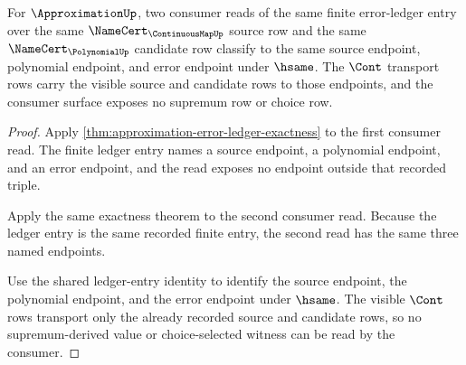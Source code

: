 \begin{theorem}
\label{thm:approximation-finite-error-ledger-consumer-determinacy}
For $\ApproximationUp$, two consumer reads of the same finite error-ledger
entry over the same $\NameCert_{\ContinuousMapUp}$ source row and the same
$\NameCert_{\PolynomialUp}$ candidate row classify to the same source
endpoint, polynomial endpoint, and error endpoint under $\hsame$. The
$\Cont$ transport rows carry the visible source and candidate rows to those
endpoints, and the consumer surface exposes no supremum row or choice row.
\end{theorem}
\begin{proof}
Apply \autoref{thm:approximation-error-ledger-exactness} to the first
consumer read. The finite ledger entry names a source endpoint, a polynomial
endpoint, and an error endpoint, and the read exposes no endpoint outside that
recorded triple.

Apply the same exactness theorem to the second consumer read. Because the
ledger entry is the same recorded finite entry, the second read has the same
three named endpoints.

Use the shared ledger-entry identity to identify the source endpoint, the
polynomial endpoint, and the error endpoint under $\hsame$. The visible
$\Cont$ rows transport only the already recorded source and candidate rows, so
no supremum-derived value or choice-selected witness can be read by the
consumer.
\end{proof}

